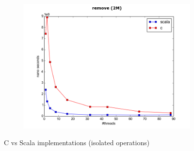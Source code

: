 \documentclass[conference]{IEEEtran}
\begin{document}
\begin{figure}
\begin{subfigure}{.5\textwidth}
			\includegraphics[width=0.45\paperwidth]{vs_scala/remove_2M.png}
			\label{fig:c_vs_scala_remove}
		\end{subfigure}
		\caption{C vs Scala implementations (isolated operations)}
		\label{fig:isolated_operations}
	\end{figure}	
\end{document}
